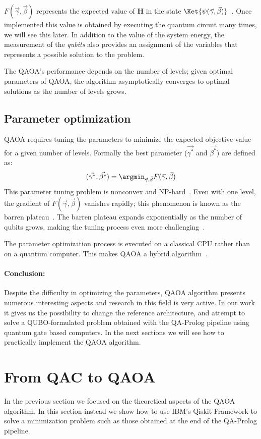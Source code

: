 $F(\vec{\gamma},\vec{\beta})$ represents the expected value of $\mathbf{H}$ in the state $\Ket{\psi(\vec{\gamma},\vec{\beta})}$~\cite{fakhimi2023quantum}. Once implemented this value is obtained by executing the quantum circuit many times, we will see this later. In addition to the value of the system energy, the measurement of the \emph{qubits} also provides an assignment of the variables that represents a possible solution to the problem.

The QAOA’s performance depends on the number of levels; given optimal parameters of QAOA, the algorithm asymptotically converges to optimal solutions as the number of levels grows\cite{farhi2014quantum}.

\subsection{Parameter optimization}
\label{sec:param_opt}
QAOA requires tuning the parameters to minimize the expected objective value for a given number of levels. Formally the best parameter ($\vec{\gamma^*}$ and $\vec{\beta^*}$) are defined as:
\[
(\vec{\gamma^*},\vec{\beta^*}) = \argmin_{\vec{\gamma},\vec{\beta}} F(\vec{\gamma},\vec{\beta}) 
\]
This parameter tuning problem is nonconvex and NP-hard~\cite{fakhimi2023quantum}. Even with one level, the gradient of $F(\vec{\gamma},\vec{\beta})$  vanishes rapidly; this phenomenon is known as the barren plateau~\cite{arrasmith2021effect, mcclean2018barren}. The barren plateau expands exponentially as the number of qubits
grows, making the tuning process even more challenging~\cite{mcclean2018barren}.

The parameter optimization process is executed on a classical CPU rather than on a quantum computer. This makes QAOA a hybrid algorithm~\cite{fakhimi2023quantum}.

\paragraph{Conclusion:} Despite the difficulty in optimizing the parameters, QAOA algorithm presents numerous interesting aspects and research in this field is very active. In our work it gives us the possibility to change the reference architecture, and attempt to solve a QUBO-formulated problem \textemdash{}obtained with the QA-Prolog pipeline\textemdash{} using quantum gate based computers. In the next sections we will see how to practically implement the QAOA algorithm.

\section{From QAC to QAOA}
In the previous section we focused on the theoretical aspects of the QAOA algorithm. In this section instead we show how to use IBM's Qiskit Framework to solve a minimization problem such as those obtained at the end of the QA-Prolog pipeline.

